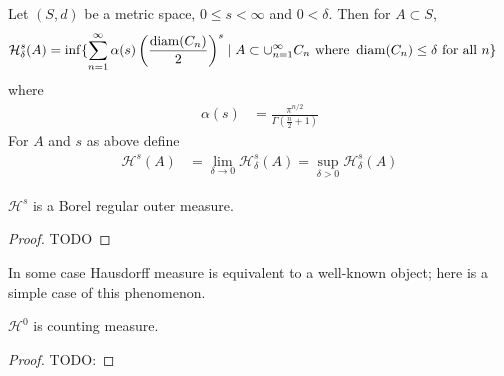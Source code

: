 \begin{defn}Let $(S,d)$ be a metric space, $0 \leq s < \infty$ and $0
  < \delta$.  Then for $A \subset S$,
\begin{align*}
\mathcal{H}^s_\delta(A) &= \inf \lbrace \sum_{n=1}^\infty \alpha(s)
\left ( \frac{\operatorname*{diam}(C_n)}{2}\right )^s \mid A \subset
\cup_{n=1}^\infty C_n \text{ where } \operatorname*{diam}(C_n) \leq \delta \text{ for
  all } n\rbrace
\end{align*}
where 
\begin{align*}
\alpha(s) &= \frac{\pi^{n/2}}{\Gamma(\frac{n}{2} + 1)}
\end{align*}
For $A$ and $s$ as above define
\begin{align*}
\mathcal{H}^s(A) &= \lim_{\delta \to 0} \mathcal{H}_\delta^s(A) = \sup_{\delta>0} \mathcal{H}_\delta^s(A)
\end{align*}
\end{defn}

\begin{thm}\label{BorelRegularityOfHausdorffMeasure}$\mathcal{H}^s$ is a Borel regular outer measure.
\end{thm}
\begin{proof}
TODO
\end{proof}

In some case Hausdorff measure is equivalent to a well-known object; here is a simple case of this phenomenon.
\begin{prop}\label{HausdoffMeasureEqualsCounting}$\mathcal{H}^0$ is counting measure.
\end{prop}
\begin{proof}
TODO:
\end{proof}

